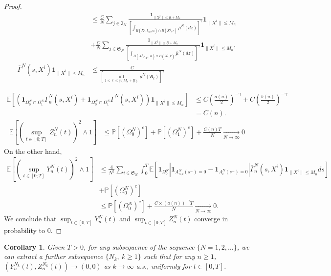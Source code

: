 \documentclass[notitlepage,reqno,11pt]{amsart}
\numberwithin{equation}{section}
\newtheorem{coro}{Corollary}[section]
\begin{document}
\begin{proof}
\begin{align*}
&\leq \frac{C}{N} \displaystyle \sum_{j\in\mathfrak{I}_N} \frac{\mathbf{1}_{\|X^j\|\leq \underline{R}+M_n}}{\left[\displaystyle \int_{B(X^j,l_{X^j},\alpha) \cap B(X^j,r)} \overline{\mu}^N(dz)\right]^{\gamma}} \mathbf{1}_{\|X^i\|\leq M_n} \\
&+\frac{C}{N} \displaystyle \sum_{j\in\mathfrak{S}_N} \frac{\mathbf{1}_{\|X^j\|\leq \underline{R}+M_n}}{\left[\displaystyle \int_{B(X^j,l_{X^j},\alpha) \cap B(X^j,r)} \overline{\mu}^N(dz)\right]^{\gamma}}  \mathbf{1}_{\|X^i\|\leq M_n},\\
\overline{\Gamma}^{N}(s,X^i)\mathbf{1}_{\|X^i\|\leq M_n}&\leq  \frac{C}{\left[\displaystyle  \inf_{1\leq \ell\leq q(M_n+\underline{R})}\overline{\mu}^N(\mathfrak{A}_\ell)\right]^\gamma} 
\end{align*}

\begin{align*}
\mathbb{E}\left[ \left(\mathbf{1}_{\Omega_0^N \cap \Omega_1^N}\overline{\Gamma}_{n}^{N}(s,X^i)+\mathbf{1}_{\Omega_0^N \cap \Omega_1^N} \overline{\Gamma}^{N}(s,X^i)\right)\mathbf{1}_{\|X^i\|\leq M_n}\right]&\leq C\left(\frac{a(n)}{2}\right)^{-\gamma}+C\left(\frac{b(n)}{2}\right)^{-\gamma}\\
&=C(n).
\end{align*}
\begin{align*}
\mathbb{E}\left[\left(\sup_{t\in[0;T]}Z^N_n(t)\right)^2 \wedge 1\right]&\leq  \mathbb{P}\left[\left( \Omega_0^N \right)^c\right]+\mathbb{P}\left[\left( \Omega_1^N \right)^c\right]+ \frac{C(n)T}{N} \xrightarrow[N \to \infty]{} 0
\end{align*}
On the other hand,
\begin{align*}
\mathbb{E}\left[\left(\sup_{t\in[0;T]}Y^N_n(t)\right)^2 \wedge 1\right]&\leq \frac{4}{N^2}\sum_{i\in\mathfrak{S}_N} \int_{0}^{T}\mathbb{E}\left[\mathbf{1}_{ \Omega_0^N}\left|\mathbf{1}_{A^N_{n,i}(s^{-}) = 0}-\mathbf{1}_{A^N_{i}(s^{-}) = 0}\right| \overline{\Gamma}_{n}^{N}(s,X^i)\mathbf{1}_{\|X^i\|\leq M_n}ds\right]\\
&+ \mathbb{P}\left[\left( \Omega_0^N\right)^c\right]\\
&\leq  \mathbb{P}\left[\left( \Omega_0^N\right)^c\right]+ \frac{C\times (a(n))^{-\gamma} T}{N}\xrightarrow[N \to \infty]{} 0.
\end{align*}
We conclude that  $\displaystyle \sup_{t\in[0;T]} Y^N_n(t)$ and $\displaystyle \sup_{t\in[0;T]}Z^N_n(t)$ converge in probability to 0.
\end{proof}
\begin{coro}
\label{coro}
Given $T>0$, for any subsequence of the sequence $\{N=1,2,\ldots\}$, we can extract a further subsequence $\{N_k,\ k\ge1\}$ such that 
for any $n\ge1$, $(Y^{N_k}_n(t),Z^{N_k}_n(t))\to(0,0)$ as $k\to\infty$ a.s., uniformly for $t\in[0,T]$.
\end{coro}
\end{document}
